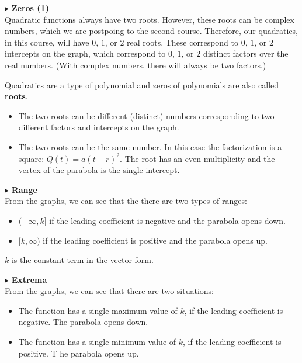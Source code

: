 \documentclass{ximera}
\begin{document}
$\blacktriangleright$ \textbf{\textcolor{red!10!blue!90!}{Zeros (1)}} \\
Quadratic functions always have two roots.  However, these roots can be complex numbers, which we are postpoing to the second course.  Therefore, our quadratics, in this course, will have $0$, $1$, or $2$ real roots.  These correspond to  $0$, $1$, or $2$ intercepts on the graph, which correspond to $0$, $1$, or $2$ distinct factors over the real numbers. (With complex numbers, there will always be two factors.)

Quadratics are a type of polynomial and zeros of polynomials are also called \textbf{roots}.

\begin{itemize}
\item The two roots can be different (distinct) numbers corresponding to two different factors and intercepts on the graph.  
\item The two roots can be the same number.  In this case the factorization is a square: $Q(t) = a(t-r)^2$.  The root has an even multiplicity and the vertex of the parabola is the single intercept.
\end{itemize}


$\blacktriangleright$ \textbf{\textcolor{red!10!blue!90!}{Range}} \\
From the graphs, we can see that the there are two types of ranges: 
\begin{itemize}
\item $(-\infty, k]$ if the leading coefficient is negative and the parabola opens down.
\item $[k, \infty)$ if the leading coefficient is positive and the parabola opens up.
\end{itemize}

$k$ is the constant term in the vector form.



$\blacktriangleright$  \textbf{\textcolor{red!10!blue!90!}{Extrema}} \\
From the graphs, we can see that there are two situations:
\begin{itemize}
\item The function has a single maximum value of $k$, if the leading coefficient is negative. The parabola opens down.
\item The function has a single minimum value of $k$, if the leading coefficient is positive. T
he parabola opens up.
\end{itemize}
\end{document}

